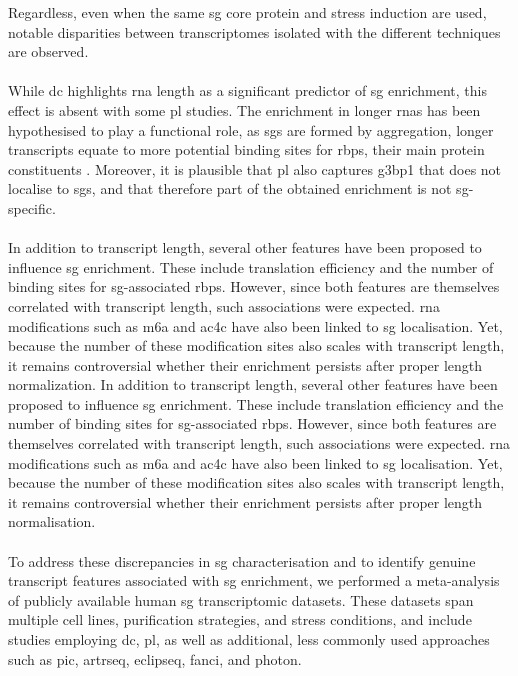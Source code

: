 Regardless, even when the same \gls{sg} core protein and stress induction are used, notable disparities between transcriptomes isolated with the different techniques are observed\cite{glauninger_stressful_2022}. 
\\
\\
While \gls{dc} highlights \gls{rna} length as a significant predictor of \gls{sg} enrichment\cite{khong_stress_2017}, this effect is absent with some \gls{pl} studies\cite{padron_proximity_2019,somasekharan_g3bp1-linked_2020}. The enrichment in longer \glspl{rna} has been hypothesised to play a functional role, as \glspl{sg} are formed by aggregation, longer transcripts equate to more potential binding sites for \glspl{rbp}, their main protein constituents \cite{khong_stress_2017}. Moreover, it is plausible that \gls{pl} also captures \gls{g3bp1} that does not localise to \glspl{sg}, and that therefore part of the obtained enrichment is not \gls{sg}-specific\cite{somasekharan_g3bp1-linked_2020}. 
\\
\\
In addition to transcript length, several other features have been proposed to influence \gls{sg} enrichment. These include translation efficiency and the number of binding sites for \gls{sg}-associated \glspl{rbp}\cite{khong_stress_2017}. However, since both features are themselves correlated with transcript length, such associations were expected\cite{glauninger_stressful_2022}. \gls{rna} modifications such as \gls{m6a}\cite{di_timoteo_m6a_2024} and \gls{ac4c}\cite{kudrin_n4-acetylcytidine_2024} have also been linked to \gls{sg} localisation. Yet, because the number of these modification sites also scales with transcript length, it remains controversial whether their enrichment persists after proper length normalization\cite{khong_limited_2022}.
In addition to transcript length, several other features have been proposed to influence \gls{sg} enrichment. These include translation efficiency and the number of binding sites for \gls{sg}-associated \glspl{rbp}\cite{khong_stress_2017}. However, since both features are themselves correlated with transcript length, such associations were expected\cite{glauninger_stressful_2022}. \gls{rna} modifications such as \gls{m6a}\cite{di_timoteo_m6a_2024} and \gls{ac4c}\cite{kudrin_n4-acetylcytidine_2024} have also been linked to \gls{sg} localisation. Yet, because the number of these modification sites also scales with transcript length, it remains controversial whether their enrichment persists after proper length normalisation\cite{khong_limited_2022}.
\\
\\
To address these discrepancies in \gls{sg} characterisation and to identify genuine transcript features associated with \gls{sg} enrichment, we performed a meta-analysis of publicly available human \gls{sg} transcriptomic datasets. These datasets span multiple cell lines, purification strategies, and stress conditions, and include studies employing \gls{dc}, \gls{pl}, as well as additional, less commonly used approaches such as \gls{pic}\cite{honda_high-depth_2021}, \gls{artrseq}\cite{xiao_profiling_2024}, \gls{eclipseq}\cite{sato_stress_2023}, \gls{fanci}\cite{zhou_rna_2024}, and \gls{photon}\cite{rajachandran_subcellular_2025}.

